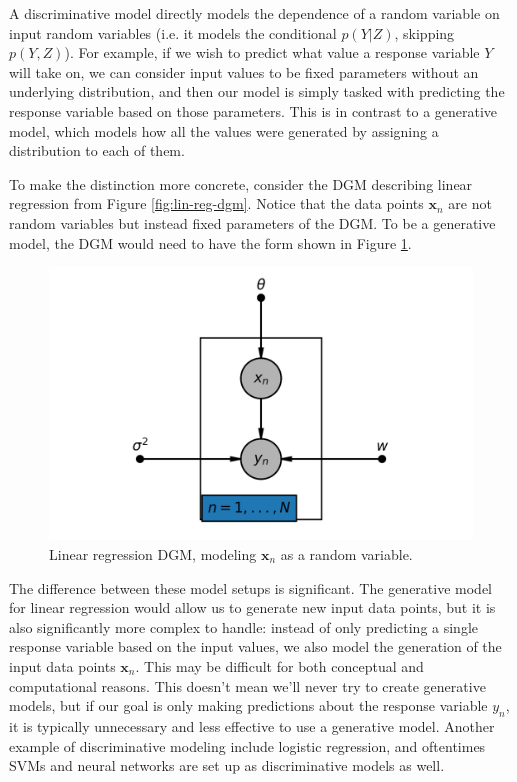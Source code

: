 A discriminative model directly models the dependence of a random variable on input random variables (i.e. it models the conditional $p(Y|Z)$, skipping $p(Y,Z)$). For example, if we wish to predict what value a response variable $Y$ will take on, we can consider input values to be fixed parameters without an underlying distribution, and then our model is simply tasked with predicting the response variable based on those parameters. %
This is in contrast to a generative model, which models how all the values were generated by assigning a distribution to each of them. 

To make the distinction more concrete, consider the DGM describing linear regression from Figure \ref{fig:lin-reg-dgm}. Notice that the data points $\textbf{x}_n$ are not random variables but instead fixed parameters of the DGM. To be a generative model, the DGM would need to have the form shown in Figure \ref{fig:lin-reg-model-x}.
\begin{figure}
	\centering
	\includegraphics[width=0.5\paperwidth]{../GraphicalModels/fig/lin-reg-model-x.png}
    \caption{Linear regression DGM, modeling $\textbf{x}_n$ as a random variable.}
	\label{fig:lin-reg-model-x}
\end{figure}

The difference between these model setups is significant. The generative model for linear regression would allow us to generate new input data points, but it is also significantly more complex to handle: instead of only predicting a single response variable based on the input values, we also model the generation of the input data points $\textbf{x}_n$. This may be difficult for both conceptual and computational reasons. This doesn't mean we'll never try to create generative models, but if our goal is only making predictions about the response variable $y_n$, it is typically unnecessary and less effective to use a generative model. Another example  of discriminative modeling include logistic regression, and oftentimes SVMs and neural networks are set up as discriminative models as well. 

